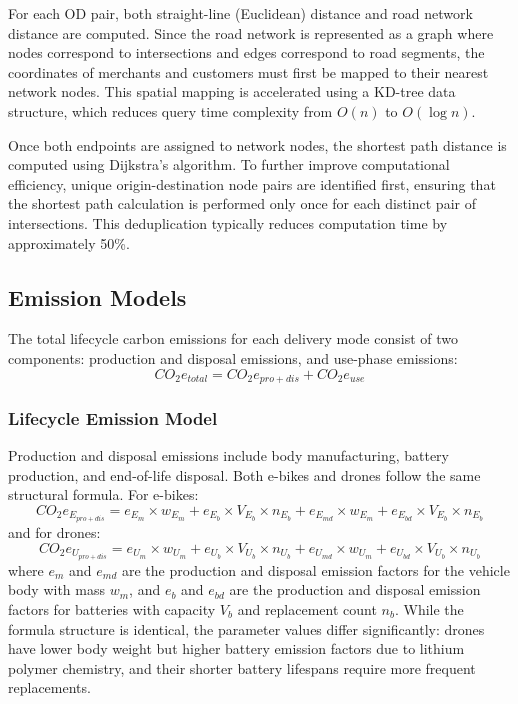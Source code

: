 \documentclass[11pt]{article}
\begin{document}
For each OD pair, both straight-line (Euclidean) distance and road network distance are computed. Since the road network is represented as a graph where nodes correspond to intersections and edges correspond to road segments, the coordinates of merchants and customers must first be mapped to their nearest network nodes. This spatial mapping is accelerated using a KD-tree data structure, which reduces query time complexity from $O(n)$ to $O(\log n)$.

Once both endpoints are assigned to network nodes, the shortest path distance is computed using Dijkstra's algorithm. To further improve computational efficiency, unique origin-destination node pairs are identified first, ensuring that the shortest path calculation is performed only once for each distinct pair of intersections. This deduplication typically reduces computation time by approximately 50\%.

\subsection{Emission Models}

The total lifecycle carbon emissions for each delivery mode consist of two components: production and disposal emissions, and use-phase emissions:
\begin{equation}
  CO_2e_{total} = CO_2e_{pro+dis} + CO_2e_{use}
\end{equation}

\subsubsection{Lifecycle Emission Model}

Production and disposal emissions include body manufacturing, battery production, and end-of-life disposal. Both e-bikes and drones follow the same structural formula. For e-bikes:
\begin{equation}
  CO_2e_{E_{pro+dis}} = e_{E_m} \times w_{E_m} + e_{E_b} \times V_{E_b} \times n_{E_b} + e_{E_{md}} \times w_{E_m} + e_{E_{bd}} \times V_{E_b} \times n_{E_b}
\end{equation}
and for drones:
\begin{equation}
  CO_2e_{U_{pro+dis}} = e_{U_m} \times w_{U_m} + e_{U_b} \times V_{U_b} \times n_{U_b} + e_{U_{md}} \times w_{U_m} + e_{U_{bd}} \times V_{U_b} \times n_{U_b}
\end{equation}
where $e_m$ and $e_{md}$ are the production and disposal emission factors for the vehicle body with mass $w_m$, and $e_b$ and $e_{bd}$ are the production and disposal emission factors for batteries with capacity $V_b$ and replacement count $n_b$. While the formula structure is identical, the parameter values differ significantly: drones have lower body weight but higher battery emission factors due to lithium polymer chemistry, and their shorter battery lifespans require more frequent replacements.
\end{document}

